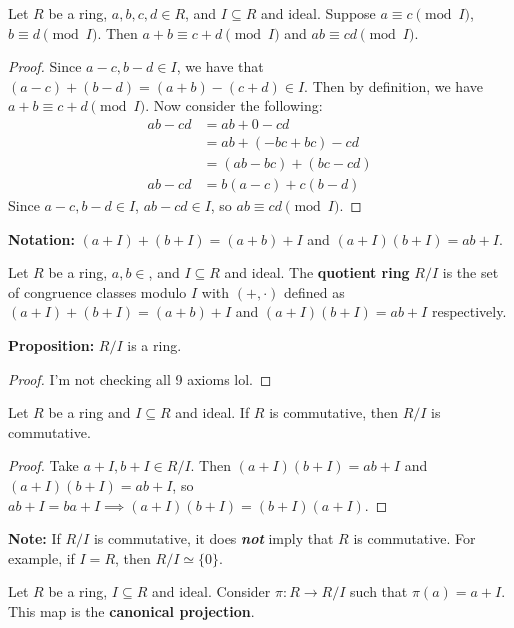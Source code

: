 \documentclass [12pt] {article}
\newenvironment{definition}[1]{\begin{tcolorbox}[title={Definition: #1},colback=blue!5!white,colframe=black!75!blue]}{\end{tcolorbox}}
\newenvironment{theorem}[1]{\begin{tcolorbox}[title={Theorem #1},colback=green!5!white,colframe=black!75!green]}{\end{tcolorbox}}
\renewcommand{\bf}[1]{\textbf{{#1}}}
\newcommand{\ib}[1]{\textit{\textbf{{#1}}}}
\begin{document}
\newpage
\begin{theorem}{}
    Let $R$ be a ring, $a, b, c, d \in R$, and $I \subseteq R$ and ideal. Suppose 
    $a \equiv c \pmod{I}$, $b \equiv d \pmod{I}$. Then $a + b \equiv c + d \pmod{I}$ and
    $ab \equiv cd \pmod{I}$.
\end{theorem}
\begin{proof}
    Since $a - c, b - d \in I$, we have that $(a - c) + (b - d) = (a + b) - (c + d) \in I$. Then by
    definition, we have $a + b \equiv c + d \pmod{I}$. Now consider the following: 
    \begin{align*}
        ab - cd &= ab + 0 - cd \\
                &= ab + (-bc + bc) - cd \\
                &= (ab - bc) + (bc - cd) \\
        ab - cd &= b(a - c) + c(b - d)
    \end{align*}
    Since $a - c, b - d \in I$, $ab - cd \in I$, so $ab \equiv cd \pmod{I}$.
\end{proof}
\bf{Notation:} $(a + I) + (b + I) = (a + b) + I$ and $(a + I)(b + I) = ab + I$.

\begin{definition}{Quotient Ring}
    Let $R$ be a ring, $a, b \in $, and $I \subseteq R$ and ideal. The \bf{quotient ring} $R/I$ is
    the set of congruence classes modulo $I$ with $(+, \cdot)$ defined as 
    $(a + I) + (b + I) = (a + b) + I$ and $(a + I)(b + I) = ab + I$ respectively.
\end{definition}
\bf{Proposition:} $R/I$ is a ring.
\begin{proof}
    I'm not checking all 9 axioms lol. 
\end{proof}

\begin{theorem}{}
    Let $R$ be a ring and $I \subseteq R$ and ideal. If $R$ is commutative, then $R/I$ is
    commutative.
\end{theorem}
\begin{proof}
    Take $a + I, b + I \in R/I$. Then $(a + I)(b + I) = ab + I$ and $(a + I)(b + I) = ab + I$, so
    $ab + I = ba + I \implies (a + I)(b + I) = (b + I)(a + I)$.
\end{proof}
\bf{Note:} If $R/I$ is commutative, it does \ib{not} imply that $R$ is commutative. For example, if
$I = R$, then $R/I \simeq \{ 0 \}$.

\begin{definition}{Canonical Projection}
    Let $R$ be a ring, $I \subseteq R$ and ideal. Consider $\pi : R \to R/I$ such that 
    $\pi(a) = a + I$. This map is the \bf{canonical projection}.
\end{definition}
\end{document}
